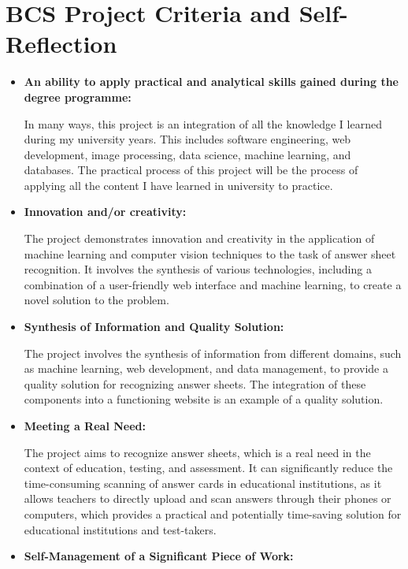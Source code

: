 \documentclass[twocolumn]{article}
\begin{document}
 

\section{BCS Project Criteria and Self-Reflection}
\begin{itemize}
    \item \textbf{An ability to apply practical and analytical skills gained during the degree programme:}
    
    In many ways, this project is an integration of all the knowledge I learned during my university years. This includes software engineering, web development, image processing, data science, machine learning, and databases. The practical process of this project will be the process of applying all the content I have learned in university to practice.

    \item \textbf{Innovation and/or creativity:}

    The project demonstrates innovation and creativity in the application of machine learning and computer vision techniques to the task of answer sheet recognition. It involves the synthesis of various technologies, including a combination of a user-friendly web interface and machine learning, to create a novel solution to the problem.

    \item \textbf{Synthesis of Information and Quality Solution:}

    The project involves the synthesis of information from different domains, such as machine learning, web development, and data management, to provide a quality solution for recognizing answer sheets. The integration of these components into a functioning website is an example of a quality solution.

    \item \textbf{Meeting a Real Need: }

    The project aims to recognize answer sheets, which is a real need in the context of education, testing, and assessment. It can significantly reduce the time-consuming scanning of answer cards in educational institutions, as it allows teachers to directly upload and scan answers through their phones or computers, which provides a practical and potentially time-saving solution for educational institutions and test-takers.

    \item \textbf{Self-Management of a Significant Piece of Work:}


\end{itemize}
\end{document}
